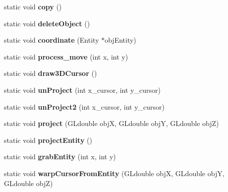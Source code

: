 \begin{DoxyCompactItemize}
\item 
static void {\bfseries copy} ()\hypertarget{classglDisplay_a228b075ea31aba4b3f7fd9ec44464cb3}{}\label{classglDisplay_a228b075ea31aba4b3f7fd9ec44464cb3}

\item 
static void {\bfseries delete\+Object} ()\hypertarget{classglDisplay_aeb5514cd34ecdede77f53033ab05fcf3}{}\label{classglDisplay_aeb5514cd34ecdede77f53033ab05fcf3}

\item 
static void {\bfseries coordinate} (Entity $\ast$obj\+Entity)\hypertarget{classglDisplay_a5aeaf6010682f692869dc0acc9c82813}{}\label{classglDisplay_a5aeaf6010682f692869dc0acc9c82813}

\item 
static void {\bfseries process\+\_\+move} (int x, int y)\hypertarget{classglDisplay_a142f30aa20a393a6a4ddb7a9d149f7dc}{}\label{classglDisplay_a142f30aa20a393a6a4ddb7a9d149f7dc}

\item 
static void {\bfseries draw3\+D\+Cursor} ()\hypertarget{classglDisplay_a2c25cf7e8d5b808fca415381b7ee488e}{}\label{classglDisplay_a2c25cf7e8d5b808fca415381b7ee488e}

\item 
static void {\bfseries un\+Project} (int x\+\_\+cursor, int y\+\_\+cursor)\hypertarget{classglDisplay_aafde8155be3bee57a97b0223b9c6025d}{}\label{classglDisplay_aafde8155be3bee57a97b0223b9c6025d}

\item 
static void {\bfseries un\+Project2} (int x\+\_\+cursor, int y\+\_\+cursor)\hypertarget{classglDisplay_a20e9eb5d6c96bfeb7da5ee2aafdd2679}{}\label{classglDisplay_a20e9eb5d6c96bfeb7da5ee2aafdd2679}

\item 
static void {\bfseries project} (G\+Ldouble objX, G\+Ldouble objY, G\+Ldouble objZ)\hypertarget{classglDisplay_a0ea20944746a75d59d7acee9f1446e0f}{}\label{classglDisplay_a0ea20944746a75d59d7acee9f1446e0f}

\item 
static void {\bfseries project\+Entity} ()\hypertarget{classglDisplay_ae851b3b52827756f2df418d6cf6d6ceb}{}\label{classglDisplay_ae851b3b52827756f2df418d6cf6d6ceb}

\item 
static void {\bfseries grab\+Entity} (int x, int y)\hypertarget{classglDisplay_a5d43356ddd82ca298d737783ee8b5a4c}{}\label{classglDisplay_a5d43356ddd82ca298d737783ee8b5a4c}

\item 
static void {\bfseries warp\+Cursor\+From\+Entity} (G\+Ldouble objX, G\+Ldouble objY, G\+Ldouble objZ)\hypertarget{classglDisplay_a0cc37d9b0deb8246c06ef00d5e47526f}{}\label{classglDisplay_a0cc37d9b0deb8246c06ef00d5e47526f}

\end{DoxyCompactItemize}
